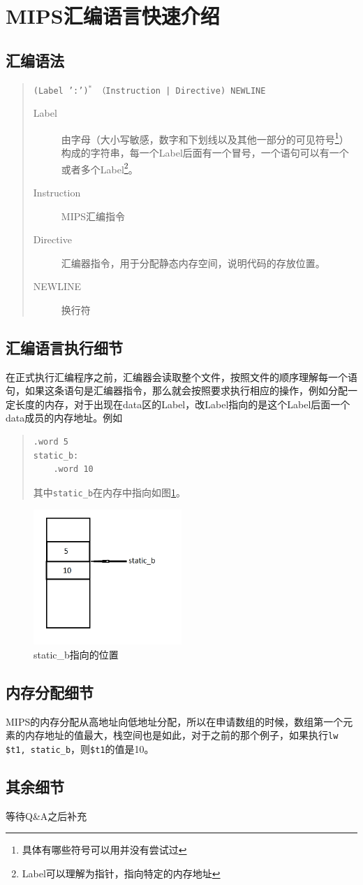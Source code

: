 \documentclass[a4paper, 11pt]{article}
\begin{document}
\section{MIPS汇编语言快速介绍}
\subsection{汇编语法}
	\begin{quotation}
		\texttt{(Label ':')$^*$ （Instruction | Directive) NEWLINE}
		\begin{description}
			\item [Label] 由字母（大小写敏感，数字和下划线以及其他一部分的可见符号\footnote{具体有哪些符号可以用并没有尝试过}）构成的字符串，每一个Label后面有一个冒号，一个语句可以有一个或者多个Label\footnote{Label可以理解为指针，指向特定的内存地址}。
			\item [Instruction] MIPS汇编指令
			\item [Directive] 汇编器指令，用于分配静态内存空间，说明代码的存放位置。
			\item [NEWLINE] 换行符
		\end{description}
	\end{quotation}
\subsection{汇编语言执行细节}
	在正式执行汇编程序之前，汇编器会读取整个文件，按照文件的顺序理解每一个语句，如果这条语句是汇编器指令，那么就会按照要求执行相应的操作，例如分配一定长度的内存，对于出现在data区的Label，改Label指向的是这个Label后面一个data成员的内存地址。例如
	
	\begin{quotation}
\begin{lstlisting}[frame=single]
	.word 5
static_b:
	.word 10
\end{lstlisting}
	其中\texttt{static\_b}在内存中指向如图\ref{fig:static-b}。
	\end{quotation}
	\begin{figure}
		\centering
		\includegraphics[width=0.5\textwidth]{label-to-data}
		\caption{static\_b指向的位置}
		\label{fig:static-b}
	\end{figure}
\subsection{内存分配细节}
	MIPS的内存分配从高地址向低地址分配，所以在申请数组的时候，数组第一个元素的内存地址的值最大，栈空间也是如此，对于之前的那个例子，如果执行\texttt{lw \$t1, static\_b}，则\texttt{\$t1}的值是10。
\subsection{其余细节}
	等待Q\&A之后补充
\end{document}
